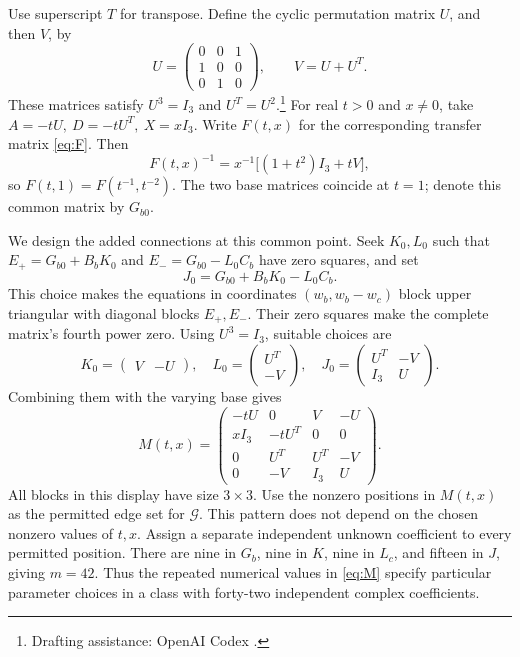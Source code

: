 \documentclass[letterpaper,10pt,conference]{ieeeconf}
\newcommand{\aicite}{\footnote{Drafting assistance: OpenAI Codex \cite{codex}.}\space}
\begin{document}
Use superscript \(T\) for transpose. Define the cyclic permutation
matrix \(U\), and then \(V\), by
\[
 U=\begin{pmatrix}0&0&1\\1&0&0\\0&1&0\end{pmatrix},
 \qquad V=U+U^T.
\]
These matrices satisfy
\(U^3=I_3\) and \(U^T=U^2\).\aicite
For real \(t>0\) and \(x\ne0\), take
\(A=-tU,\ D=-tU^T,\ X=xI_3\). Write \(F(t,x)\) for the
corresponding transfer matrix \eqref{eq:F}. Then
\begin{equation}\label{eq:symmetric}
 F(t,x)^{-1}=x^{-1}\big[(1+t^2)I_3+tV\big],
\end{equation}
so \(F(t,1)=F(t^{-1},t^{-2})\). The two base matrices coincide
at \(t=1\); denote this common matrix by \(G_{b0}\).

We design the added connections at this common point. Seek
\(K_0,L_0\) such that
\(E_+=G_{b0}+B_bK_0\) and \(E_-=G_{b0}-L_0C_b\) have zero
squares, and set
\[
 J_0=G_{b0}+B_bK_0-L_0C_b.
\]
This choice makes the equations in coordinates \((w_b,w_b-w_c)\)
block upper triangular with diagonal blocks \(E_+,E_-\).
Their zero squares make the complete matrix's fourth power zero.
Using \(U^3=I_3\), suitable choices are
\begin{equation}\label{eq:controller}
 K_0=\begin{pmatrix}V&-U\end{pmatrix},\quad
 L_0=\begin{pmatrix}U^T\\-V\end{pmatrix},\quad
 J_0=\begin{pmatrix}U^T&-V\\I_3&U\end{pmatrix}.
\end{equation}
Combining them with the varying base gives
\begin{equation}\label{eq:M}
 M(t,x)=
 \begin{pmatrix}
 -tU&0&V&-U\\
 xI_3&-tU^T&0&0\\
 0&U^T&U^T&-V\\
 0&-V&I_3&U
 \end{pmatrix}.
\end{equation}
All blocks in this display have size \(3\times3\).
Use the nonzero positions in \(M(t,x)\) as the permitted edge set
for \(\mathcal G\). This pattern does not depend on the chosen
nonzero values of \(t,x\).
Assign a separate independent unknown coefficient to every permitted
position. There are nine in \(G_b\), nine in \(K\), nine in \(L_c\),
and fifteen in \(J\), giving \(m=42\).
Thus the repeated numerical values in \eqref{eq:M} specify particular
parameter choices in a class with forty-two independent complex coefficients.
\end{document}
